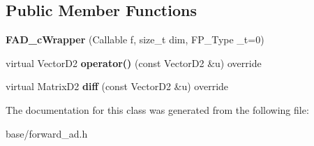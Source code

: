 \subsection*{Public Member Functions}
\begin{DoxyCompactItemize}
\item 
\mbox{\label{classFAD__cWrapper_aac4ca71e136e781b51d5a0b21c4da73c}} 
{\bfseries F\+A\+D\+\_\+c\+Wrapper} (Callable f, size\+\_\+t dim, F\+P\+\_\+\+Type \+\_\+t=0)
\item 
\mbox{\label{classFAD__cWrapper_a866172a2028651446996452096b2cb24}} 
virtual Vector\+D2 {\bfseries operator()} (const Vector\+D2 \&u) override
\item 
\mbox{\label{classFAD__cWrapper_aba8e02646b286f26ce68c101dc3fe771}} 
virtual Matrix\+D2 {\bfseries diff} (const Vector\+D2 \&u) override
\end{DoxyCompactItemize}


The documentation for this class was generated from the following file\+:\begin{DoxyCompactItemize}
\item 
base/forward\+\_\+ad.\+h\end{DoxyCompactItemize}
